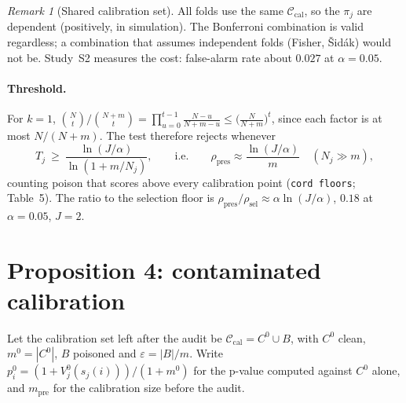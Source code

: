 \documentclass[11pt]{article}
\theoremstyle{definition}
\theoremstyle{remark}
\newtheorem{remark}{Remark}
\newcommand{\Cal}{\mathcal{C}_{\mathrm{cal}}}
\newcommand{\1}{\mathbf{1}}
\begin{document}
\begin{remark}[Shared calibration set]
All folds use the same $\Cal$, so the $\pi_j$ are dependent (positively, in simulation). The
Bonferroni combination is valid regardless; a combination that assumes independent folds (Fisher,
\v{S}id\'ak) would not be. Study~S2 measures the cost: false-alarm rate about $0.027$ at
$\alpha=0.05$.
\end{remark}

\paragraph{Threshold.} For $k=1$,
$\binom{N}{t}\big/\binom{N+m}{t}=\prod_{u=0}^{t-1}\frac{N-u}{N+m-u}\le\bigl(\frac{N}{N+m}\bigr)^t$,
since each factor is at most $N/(N+m)$. The test therefore rejects whenever
\[
T_j\ \ge\ \frac{\ln(J/\alpha)}{\ln(1+m/N_j)},\qquad\text{i.e.}\qquad
\rho_{\mathrm{pres}}\approx\frac{\ln(J/\alpha)}{m}\quad(N_j\gg m),
\]
counting poison that scores above every calibration point (\texttt{cord floors}; Table~5).
The ratio to the selection floor is $\rho_{\mathrm{pres}}/\rho_{\mathrm{sel}}\approx\alpha\ln(J/\alpha)$,
$0.18$ at $\alpha=0.05$, $J=2$.

\section{Proposition 4: contaminated calibration}

Let the calibration set left after the audit be $\Cal=C^0\cup B$, with $C^0$ clean,
$m^0=|C^0|$, $B$ poisoned and $\varepsilon=|B|/m$. Write $p^0_i=(1+V^0_j(s_j(i)))/(1+m^0)$ for the
p-value computed against $C^0$ alone, and $m_{\mathrm{pre}}$ for the calibration size before the
audit.
\end{document}
